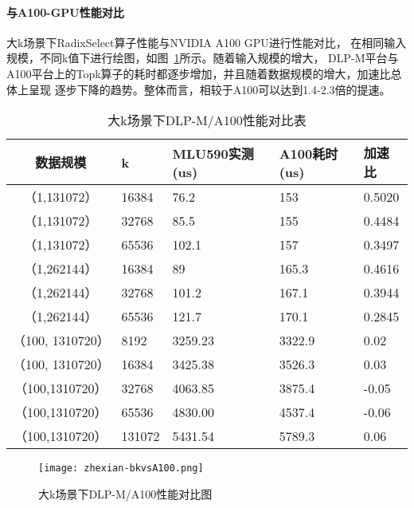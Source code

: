 \paragraph{与A100-GPU性能对比}
大k场景下RadixSelect算子性能与NVIDIA A100 GPU进行性能对比，
在相同输入规模，不同k值下进行绘图，如图~\ref{fig:bench_bk_vsa100_zhexian}所示。随着输入规模的增大，
DLP-M平台与A100平台上的Topk算子的耗时都逐步增加，并且随着数据规模的增大，加速比总体上呈现
逐步下降的趋势。整体而言，相较于A100可以达到1.4-2.3倍的提速。
\begin{table}
    \centering
    \caption{大k场景下DLP-M/A100性能对比表}
    \begin{tabular}{cllll}
    \toprule
    数据规模 & k &   MLU590实测(us) & A100耗时(us) & 加速比 \\
    \midrule

    （1,131072） & 16384    & 76.2 & 153 & 0.5020\\
    （1,131072） & 32768   & 85.5 & 155 & 0.4484\\
    （1,131072） & 65536   & 102.1 & 157 & 0.3497  \\
    
    （1,262144） & 16384   & 89 & 165.3 & 0.4616  \\
    （1,262144） & 32768   & 101.2 & 167.1 & 0.3944 \\
    （1,262144） & 65536   & 121.7 & 170.1 & 0.2845 \\
    
    （100, 1310720）& 8192 & 3259.23 & 3322.9 & 0.02\\
    （100, 1310720）& 16384 & 3425.38 & 3526.3 & 0.03\\
    
    （100,1310720）&32768    & 4063.85 & 3875.4 & -0.05  \\
    （100,1310720）&65536    & 4830.00 & 4537.4 & -0.06 \\
    （100,1310720）&131072   & 5431.54 & 5789.3 & 0.06 \\
  
    \bottomrule
    \end{tabular}
    \end{table}


    \begin{figure}[ht]
        \centering
        \texttt{[image: zhexian-bkvsA100.png]}
        \caption{大k场景下DLP-M/A100性能对比图}
        \label{fig:bench_bk_vsa100_zhexian}
    \end{figure}
    
